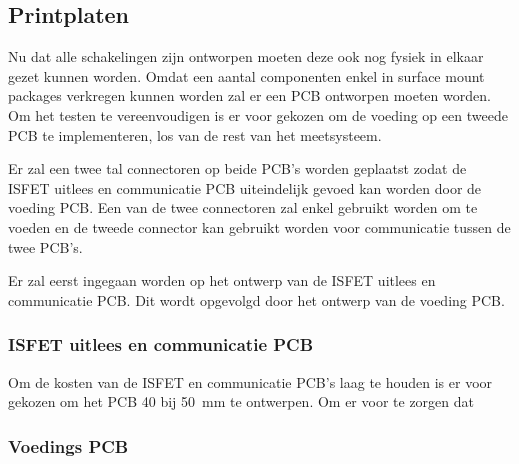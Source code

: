 \subsection{Printplaten}
Nu dat alle schakelingen zijn ontworpen moeten deze ook nog fysiek in elkaar gezet kunnen worden. Omdat een aantal componenten enkel in surface mount packages verkregen kunnen worden zal er een PCB ontworpen moeten worden. Om het testen te vereenvoudigen is er voor gekozen om de voeding op een tweede PCB te implementeren, los van de rest van het \si{\pH} meetsysteem.

Er zal een twee tal connectoren op beide PCB's worden geplaatst zodat de ISFET uitlees en communicatie PCB uiteindelijk gevoed kan worden door de voeding PCB. Een van de twee connectoren zal enkel gebruikt worden om te voeden en de tweede connector kan gebruikt worden voor communicatie tussen de twee PCB's.

Er zal eerst ingegaan worden op het ontwerp van de ISFET uitlees en communicatie PCB. Dit wordt opgevolgd door het ontwerp van de voeding PCB.




\subsubsection{ISFET uitlees en communicatie PCB}
Om de kosten van de ISFET en communicatie PCB's laag te houden is er voor gekozen om het PCB 40 bij \qty{50}{\milli\meter} te ontwerpen. Om er voor te zorgen dat

\subsubsection{Voedings PCB}

